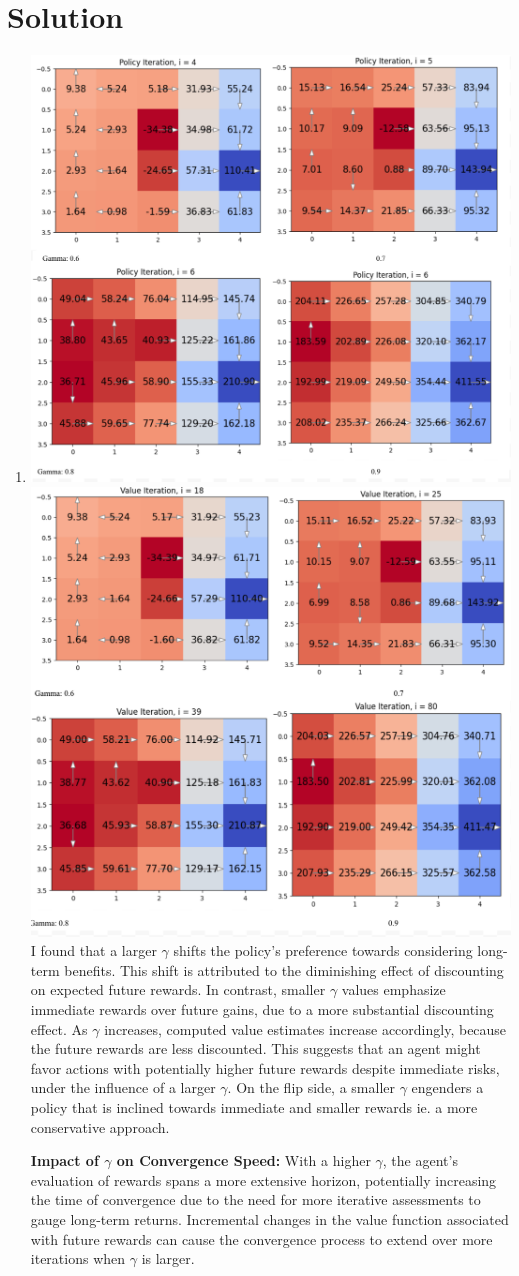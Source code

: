 \documentclass[submit]{harvardml}
\newenvironment{solution}
  {\color{blue}\section*{Solution}}
{}
\begin{document}
\begin{solution}
\begin{enumerate}
\item \includegraphics[width=0.5\linewidth]{hw6/prob41.png} \includegraphics[width=0.5\linewidth]{hw6/prob42.png} I found that a larger $\gamma$ shifts the policy's preference towards considering long-term benefits. This shift is attributed to the diminishing effect of discounting on expected future rewards. In contrast, smaller $\gamma$ values emphasize immediate rewards over future gains, due to a more substantial discounting effect. As $\gamma$ increases, computed value estimates increase accordingly, because the future rewards are less discounted. This  suggests that an agent might favor actions with potentially higher future rewards despite immediate risks, under the influence of a larger $\gamma$. On the flip side, a smaller $\gamma$ engenders a policy that is inclined towards immediate and smaller rewards ie. a more conservative approach.

\textbf{Impact of $\gamma$ on Convergence Speed:}
With a higher $\gamma$, the agent's evaluation of rewards spans a more extensive horizon, potentially increasing the time of convergence due to the need for more iterative assessments to gauge long-term returns. Incremental changes in the value function associated with future rewards can cause the convergence process to extend over more iterations when $\gamma$ is larger.


\end{enumerate}
\end{solution}
\end{document}
